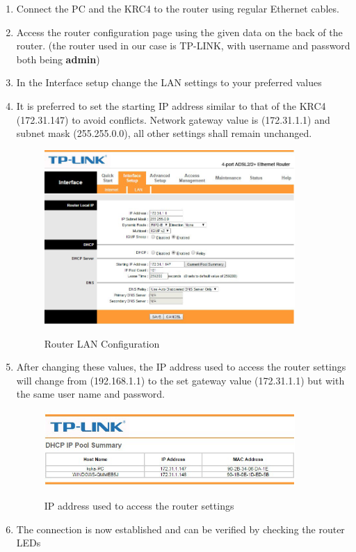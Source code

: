 \begin{enumerate}
	\item Connect the PC and the KRC4 to the router using regular Ethernet cables.
	\item Access the router configuration page using the given data on the back of the router. (the router used in our case is TP-LINK, with username and password both being \textbf{admin})
	\item In the Interface setup change the LAN settings to your preferred values
	\item It is preferred to set the starting IP address similar to that of the KRC4 (172.31.147) to avoid conflicts. Network gateway value is (172.31.1.1) and subnet mask (255.255.0.0), all other settings shall remain unchanged.
\begin{figure}[h]
  \centering
  \includegraphics[width=0.9\textwidth]{figures/parts/11}
  \label{fig:11}
  \caption{Router LAN Configuration}
\end{figure}

	\item After changing these values, the IP address used to access the router settings will change from (192.168.1.1) to the set gateway value (172.31.1.1) but with the same user name and password.
\begin{figure}[h]
    \centering
    \includegraphics[width=0.9\textwidth]{figures/parts/12}
    \label{fig:12}
    \caption{IP address used to access the router settings }
\end{figure}

	\item The connection is now established and can be verified by checking the router LEDs
\end{enumerate}